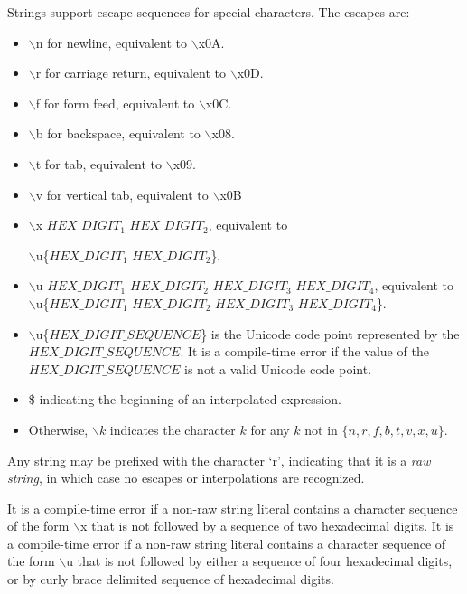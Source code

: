 \documentclass{article}
\begin{document}


\LMHash{}
Strings support escape sequences for special characters. The escapes are:
\begin{itemize}
\item  $\backslash$n for newline, equivalent to $\backslash$x0A.
\item $\backslash$r for carriage return, equivalent to $\backslash$x0D.
\item $\backslash$f for form feed, equivalent to $\backslash$x0C.
\item $\backslash$b for backspace, equivalent to $\backslash$x08.
\item $\backslash$t for tab, equivalent to $\backslash$x09.
\item $\backslash$v for vertical tab, equivalent to $\backslash$x0B
\item $\backslash$x $HEX\_DIGIT_1$ $HEX\_DIGIT_2$, equivalent to

$\backslash$u\{$HEX\_DIGIT_1$ $HEX\_DIGIT_2$\}.
\item $\backslash$u $HEX\_DIGIT_1$ $HEX\_DIGIT_2$ $HEX\_DIGIT_3$ $HEX\_DIGIT_4$, equivalent to $\backslash$u\{$HEX\_DIGIT_1$ $HEX\_DIGIT_2$ $HEX\_DIGIT_3$ $HEX\_DIGIT_4$\}.
\item $\backslash$u\{$HEX\_DIGIT\_SEQUENCE$\} is the Unicode code point represented by the $HEX\_DIGIT\_SEQUENCE$. It is a compile-time error if the value of the $HEX\_DIGIT\_SEQUENCE$ is not a valid Unicode code point.
\item \$ indicating the beginning of an interpolated expression.
\item Otherwise, $\backslash k$ indicates the character $k$ for any $k$ not in $\{n, r, f, b, t, v, x, u\}$.
 \end{itemize}

\LMHash{}
Any string may be prefixed with the character `r', indicating that it is a {\em raw string}, in which case no escapes or interpolations are recognized.

\LMHash{}
It is a compile-time error if a non-raw string literal contains a character sequence of the form $\backslash$x that is not followed by a sequence of two hexadecimal digits. It is a compile-time error if a non-raw string literal  contains a character sequence of the form $\backslash$u that is not followed by either a sequence of four hexadecimal digits, or by curly brace delimited sequence of hexadecimal digits.
\end{document}
